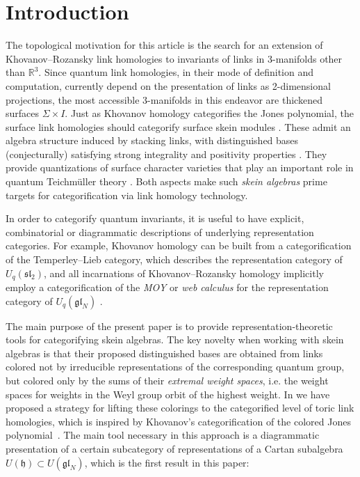\documentclass[11pt]{article}
\theoremstyle{definition}
\numberwithin{equation}{section}
\newcommand{\slnn}[1]{\mf{sl}_{#1}}
\newcommand{\glnn}[1]{\mf{gl}_{#1}}
\def\mf{\mathfrak}
\def\R{{\mathbb R}}
\begin{document}
\section{Introduction}



The topological motivation for this article is the search for an extension of
Khovanov--Rozansky link homologies \cite{Kh1, KhR} to invariants of links in
3-manifolds other than $\R^3$. Since quantum link homologies, in their mode of
definition and computation, currently depend on the presentation of links as
2-dimensional projections, the most accessible 3-manifolds in this endeavor are
thickened surfaces $\Sigma\times I$. Just as Khovanov homology categorifies the
Jones polynomial, the surface link homologies should categorify surface skein
modules \cite{Prz1,Tur, APS}. These admit an algebra structure induced by
stacking links, with distinguished bases (conjecturally) satisfying strong
integrality and positivity properties \cite{FG, Thu, Le, MS, Bou}. They provide
quantizations of surface character varieties that play an important role in
quantum Teichm{\"u}ller theory \cite{BW1}. Both aspects make such \textit{skein
algebras} prime targets for categorification via link homology technology.

In order to categorify quantum invariants, it is useful to have explicit,
combinatorial or diagrammatic descriptions of underlying representation
categories. For example, Khovanov homology can be built from a categorification
of the Temperley--Lieb category, which describes the representation category of
$U_q(\slnn{2})$, and all incarnations of Khovanov--Rozansky homology implicitly
employ a categorification of the \textit{MOY} or \textit{web calculus} for the
representation category of $U_q(\glnn{N})$ \cite{MOY, CKM}.

The main purpose of the present paper is to provide representation-theoretic
tools for categorifying skein algebras. The key novelty when working with skein
algebras is that their proposed distinguished bases are obtained from links
colored not by irreducible representations of the corresponding quantum group,
but colored only by the sums of their \textit{extremal weight spaces}, i.e. the
weight spaces for weights in the Weyl group orbit of the highest weight. In
\cite[Section 1.3]{QW} we have proposed a strategy for lifting these colorings
to the categorified level of toric link homologies, which is inspired by
Khovanov's categorification of the colored Jones polynomial~\cite{Kh7}. The main
tool necessary in this approach is a diagrammatic presentation of a certain
subcategory of representations of a Cartan subalgebra $U(\mathfrak{h})\subset
U(\glnn{N})$, which is the first result in this paper:
\end{document}
